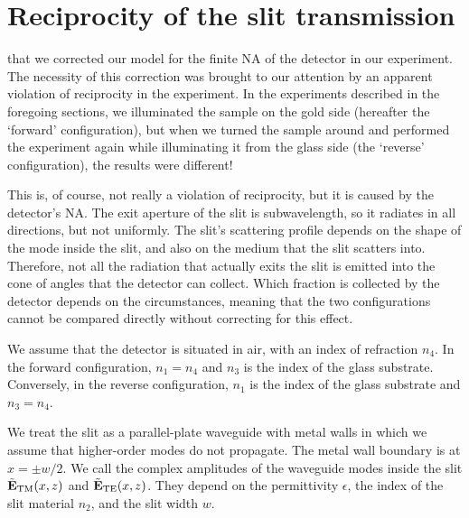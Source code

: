 \section{Reciprocity of the slit transmission}
\label{qwp:sec:correction-factor}

 that we corrected our model for the finite \gls{NA} of the detector in our experiment.
The necessity of this correction was brought to our attention by an apparent violation of reciprocity in the experiment.
In the experiments described in the foregoing sections, we illuminated the sample on the gold side (hereafter the `forward' configuration), but when we turned the sample around and performed the experiment again while illuminating it from the glass side (the `reverse' configuration), the results were different!

This is, of course, not really a violation of reciprocity, but it is caused by the detector's \gls{NA}.
The exit aperture of the slit is subwavelength, so it radiates in all directions, but not uniformly.
The slit's scattering profile depends on the shape of the mode inside the slit, and also on the medium that the slit scatters into.
Therefore, not all the radiation that actually exits the slit is emitted into the cone of angles that the detector can collect.
Which fraction is collected by the detector depends on the circumstances, meaning that the two configurations cannot be compared directly without correcting for this effect.

We assume that the detector is situated in air, with an index of refraction $n_4$.
In the forward configuration, $n_1 = n_4$ and $n_3$ is the index of the glass substrate.
Conversely, in the reverse configuration, $n_1$ is the index of the glass substrate and $n_3 = n_4$.

We treat the slit as a parallel-plate waveguide with metal walls in which we assume that higher-order modes do not propagate.
The metal wall boundary is at $x = \pm w/2$.
We call the complex amplitudes of the waveguide modes inside the slit $\tilde{\mathbf{E}}_{\text{TM}} (x, z)$ and $\tilde{\mathbf{E}}_{\text{TE}} (x, z)$.
They depend on the permittivity $\epsilon$, the index of the slit material $n_2$, and the slit width $w$.

